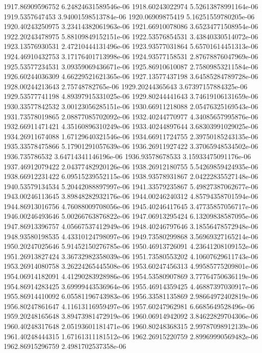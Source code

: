{1917.86909596752 6.24824631589546e-06
1918.60243022974 5.52613878991164e-06
1919.5357647453 3.94001598513784e-06
1920.06909875419 5.16251559780205e-06
1920.40243250975 3.23414382061963e-06
1921.66910078086 3.65234771508954e-06
1922.20243478975 5.88109849152151e-06
1922.53576854531 3.43840330514072e-06
1923.13576930531 2.47210444131496e-06
1923.93577031864 5.65701614451313e-06
1924.46910432753 3.17176401713998e-06
1924.93577158531 2.87678876047969e-06
1925.53577234531 3.09359069436671e-06
1925.86910610087 2.75809853211584e-06
1926.60244036309 4.66229521621365e-06
1927.13577437198 3.64585284789728e-06
1928.00244213643 2.75748782765e-06
1929.20244365643 3.67397157884325e-06
1929.53577741198 4.89397915331025e-06
1929.80244441643 3.74619106131659e-06
1930.33577842532 3.00123056285151e-06
1930.66911218088 2.05476325169543e-06
1931.73578019865 2.08877085702092e-06
1932.40244770977 4.34085657995876e-06
1932.66911471421 4.35160896310249e-06
1933.40244897644 3.68303991029025e-06
1934.26911674088 1.67129640321546e-06
1934.66911724755 2.39750185243135e-06
1935.33578475866 5.17901291057639e-06
1936.26911927422 3.37065948534502e-06
1936.735786532 3.64714341146196e-06
1936.93578678533 3.15933475091176e-06
1937.46912079422 2.04377482920126e-06
1938.26912180755 5.54269859424935e-06
1938.66912231422 6.09515239552115e-06
1938.93578931867 2.04222835527148e-06
1940.53579134534 5.20442088897997e-06
1941.33579235867 5.49827387062677e-06
1943.00246113645 3.89848282932176e-06
1944.00246240312 4.85794358701594e-06
1944.86913016756 4.76088009708056e-06
1945.40246417645 3.47735857056717e-06
1946.00246493646 5.00266763876822e-06
1947.06913295424 6.13209838587095e-06
1947.86913396757 4.05667537412949e-06
1948.40246797646 3.18556478572948e-06
1948.93580198535 4.43310124798097e-06
1949.73580299868 3.56969327165214e-06
1950.20247025646 5.91452150276785e-06
1950.46913726091 4.23641208109152e-06
1951.26913827424 3.36732982358039e-06
1951.73580553202 4.10607629611743e-06
1953.26914080758 3.26224265445508e-06
1953.60247456313 4.99585775209801e-06
1954.06914182091 4.41290283928986e-06
1954.53580907869 3.77764750636119e-06
1954.86914283425 3.69999443536964e-06
1955.46914359425 4.46887397030917e-06
1955.86914410092 6.05581196743983e-06
1956.33581135869 2.98664972402819e-06
1956.80247861647 4.11613116959497e-06
1957.60247962981 6.6685649528496e-06
1959.20248165648 3.89473981472919e-06
1960.06914942092 3.84622829704306e-06
1960.40248317648 2.05193601181471e-06
1960.80248368315 2.99787098912139e-06
1961.40248444315 1.67161311181512e-06
1962.26915220759 2.89969990569482e-06
1962.86915296759 2.4981702537358e-06
}
